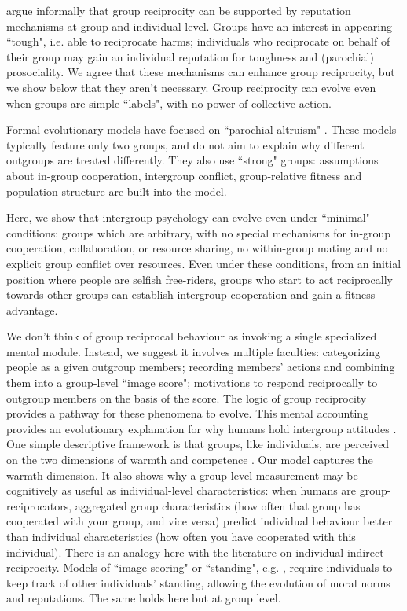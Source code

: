 \documentclass[12pt,a4paper]{article}
\begin{document}
\textcite{columbus2023parochial} argue informally that group reciprocity can
be supported by reputation mechanisms at group and individual level. Groups
have an interest in appearing ``tough", i.e. able to reciprocate harms; individuals
who reciprocate on behalf of their group may gain an individual reputation for
toughness and (parochial) prosociality. We agree that these mechanisms can enhance
group reciprocity, but we show below that they aren't necessary. Group reciprocity 
can evolve even when groups are simple ``labels", with no power of collective 
action. 

Formal evolutionary models have focused on ``parochial altruism" \parencite{choi2007coevolution,smirnov2007ancestral,rusch2014evolutionary}. These models typically feature only two groups, and do not aim to explain why different outgroups are treated differently. They also use ``strong" groups: assumptions about in-group cooperation, intergroup conflict, group-relative fitness and population structure are built into the model. 

Here, we show that intergroup psychology can evolve even under ``minimal" 
conditions: groups which are arbitrary, with no special mechanisms for in-group
cooperation, collaboration, or resource sharing, no within-group mating and no
explicit group conflict over resources. Even under these conditions, from an 
initial position where people are selfish free-riders, groups who start to act 
reciprocally towards other groups can establish intergroup cooperation and gain 
a fitness advantage. 

We don't think of group reciprocal behaviour as invoking a single specialized 
mental module. Instead, we suggest it involves multiple faculties: categorizing 
people as a given outgroup members; recording members' actions and combining them into a 
group-level ``image score"; motivations to respond reciprocally to outgroup 
members on the basis of the score. The logic of group reciprocity provides a 
pathway for these phenomena to evolve.  This mental
accounting provides an evolutionary explanation for why humans hold intergroup 
attitudes \parencite{brewer1985psychology,kurzban2001can}. One simple descriptive 
framework is that groups, like individuals, are perceived on the two dimensions of
warmth and competence \parencite{fiske2007universal}. Our model captures
the warmth dimension. It also shows why a group-level measurement may be cognitively
as useful as individual-level characteristics: when humans are group-reciprocators,
aggregated group characteristics (how often that group has cooperated
with your group, and vice versa) predict individual behaviour better than individual
characteristics (how often you have cooperated with this individual).
There is an analogy here with the literature on individual indirect reciprocity. Models of ``image scoring" or ``standing", e.g. \textcite{nowak2005evolution}, require individuals to keep track of other individuals' standing, allowing the evolution of moral norms and reputations. The same holds here but at group level.
\end{document}
